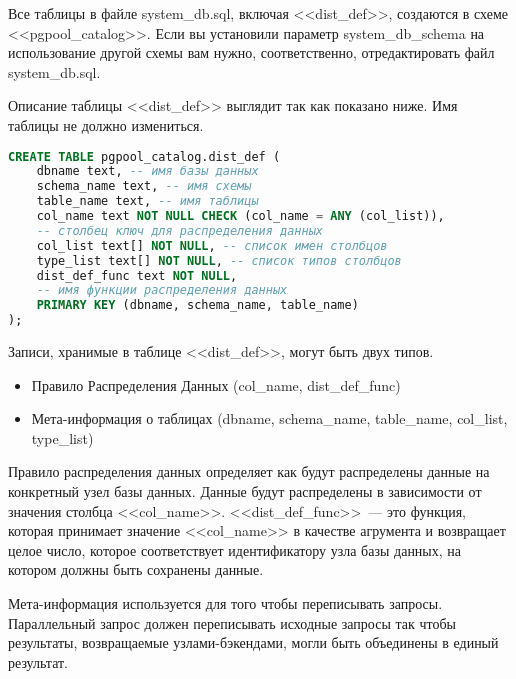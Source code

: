 Все таблицы в файле system\_db.sql, включая <<dist\_def>>, создаются в схеме <<pgpool\_catalog>>. Если вы установили 
параметр system\_db\_schema на использование другой схемы вам нужно, соответственно, отредактировать файл system\_db.sql.

Описание таблицы <<dist\_def>> выглядит так как показано ниже. Имя таблицы не должно измениться.
\begin{lstlisting}[language=SQL,label=lst:pgpool31,caption=Создание таблицы dist\_def]
CREATE TABLE pgpool_catalog.dist_def (
    dbname text, -- имя базы данных
    schema_name text, -- имя схемы
    table_name text, -- имя таблицы
    col_name text NOT NULL CHECK (col_name = ANY (col_list)), 
    -- столбец ключ для распределения данных
    col_list text[] NOT NULL, -- список имен столбцов
    type_list text[] NOT NULL, -- список типов столбцов
    dist_def_func text NOT NULL, 
    -- имя функции распределения данных
    PRIMARY KEY (dbname, schema_name, table_name)
);
\end{lstlisting}

Записи, хранимые в таблице <<dist\_def>>, могут быть двух типов.
\begin{itemize}
\item Правило Распределения Данных (col\_name, dist\_def\_func)
\item Мета-информация о таблицах (dbname, schema\_name, table\_name, col\_list, type\_list)
\end{itemize}

Правило распределения данных определяет как будут распределены данные на конкретный узел базы данных. Данные будут 
распределены в зависимости от значения столбца <<col\_name>>. <<dist\_def\_func>>~--- это функция, которая принимает 
значение <<col\_name>> в качестве агрумента и возвращает целое число, которое соответствует идентификатору узла 
базы данных, на котором должны быть сохранены данные.

Мета-информация используется для того чтобы переписывать запросы. Параллельный запрос должен переписывать исходные запросы 
так чтобы результаты, возвращаемые узлами-бэкендами, могли быть объединены в единый результат.



